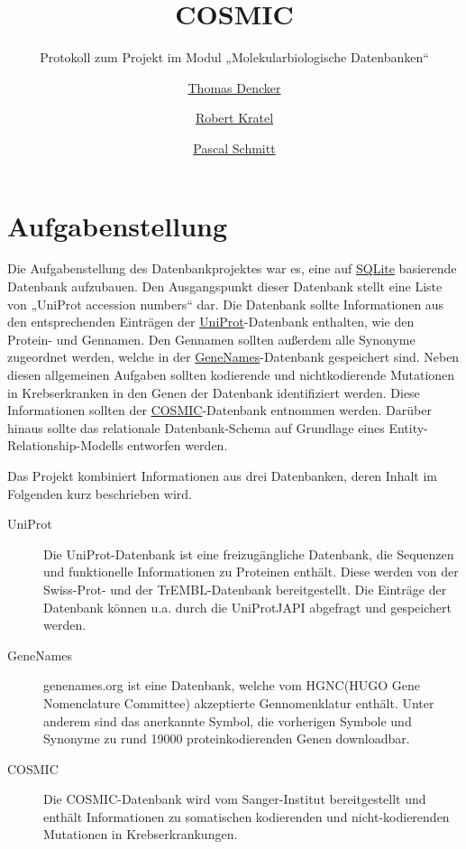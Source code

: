 \documentclass{scrartcl}
\title{COSMIC}
\subtitle{Protokoll zum Projekt im Modul „Molekularbiologische Datenbanken“}
\author{%
	\href{mailto:thomas.dencker@stud.uni-goettingen.de}{Thomas Dencker} \and
	\href{mailto:robert.kratel@stud.uni-goettingen.de}{Robert Kratel} \and
	\href{mailto:pascal.schmitt1@stud.uni-goettingen.de}{Pascal Schmitt}}
\begin{document}
\maketitle
\vfill
\tableofcontents
\newpage

\section{Aufgabenstellung}

Die Aufgabenstellung des Datenbankprojektes war es, eine auf \href{http://sqlite.org/}{SQLite} basierende Datenbank aufzubauen. Den Ausgangspunkt dieser Datenbank stellt eine Liste von „UniProt accession numbers“ dar. Die Datenbank sollte Informationen aus den entsprechenden Einträgen der \href{http://uniprot.org/}{UniProt}-Datenbank enthalten, wie den Protein- und Gennamen. Den Gennamen sollten außerdem alle Synonyme zugeordnet werden, welche in der \href{http://genenames.org/}{GeneNames}-Datenbank gespeichert sind.
   Neben diesen allgemeinen Aufgaben sollten kodierende und nichtkodierende Mutationen in Krebserkranken in den Genen der Datenbank identifiziert werden. Diese Informationen sollten der \href{http://cancer.sanger.ac.uk/cancergenome/projects/studies/}{COSMIC}-Datenbank entnommen werden.
   Darüber hinaus sollte das relationale Datenbank-Schema auf Grundlage eines Entity-Relationship-Modells entworfen werden.

Das Projekt kombiniert Informationen aus drei Datenbanken, deren Inhalt im Folgenden kurz beschrieben wird.

\begin{description}
\item[UniProt]
Die UniProt-Datenbank ist eine freizugängliche Datenbank, die Sequenzen und funktionelle Informationen zu Proteinen enthält. Diese werden von der Swiss-Prot- und der TrEMBL-Datenbank bereitgestellt. Die Einträge der Datenbank können u.a. durch die UniProtJAPI abgefragt und gespeichert werden.
\item[GeneNames]
genenames.org ist eine Datenbank, welche vom HGNC(HUGO Gene Nomenclature Committee) akzeptierte Gennomenklatur enthält. Unter anderem sind das anerkannte Symbol, die vorherigen Symbole und Synonyme zu rund 19000 proteinkodierenden Genen downloadbar.
\item[COSMIC]
Die COSMIC-Datenbank wird vom Sanger-Institut bereitgestellt und enthält Informationen zu somatischen kodierenden und nicht-kodierenden Mutationen in Krebserkrankungen.
\end{description}
\end{document}
